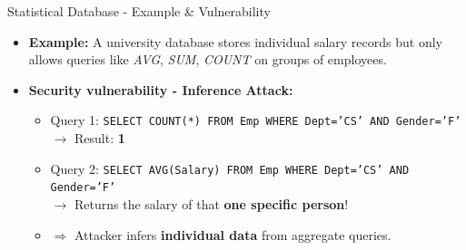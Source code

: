 

\begin{frame}{Statistical Database - Example \& Vulnerability}
    \Large
    
    \begin{itemize}
        
        \item \textbf{Example:} A university database stores individual salary records but only allows queries like \textit{AVG}, \textit{SUM}, \textit{COUNT} on groups of employees.
        
        \vspace{0.3cm}
        
        \item \textbf{Security vulnerability - Inference Attack:}
        \begin{itemize}
            \large
            \setlength{\itemsep}{0.15cm}
            
            \item Query 1: {\small\texttt{SELECT COUNT(*) FROM Emp WHERE Dept='CS' AND Gender='F'}} \\
            $\rightarrow$ Result: \textbf{1}
            
            \item Query 2: {\small\texttt{SELECT AVG(Salary) FROM Emp WHERE Dept='CS' AND Gender='F'}} \\
            $\rightarrow$ Returns the salary of that \textbf{one specific person}!
            
            \item $\Rightarrow$ Attacker infers \textbf{individual data} from aggregate queries.
        \end{itemize}
    \end{itemize}
\end{frame}

